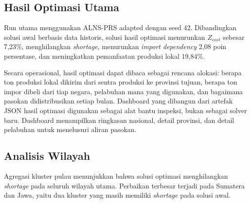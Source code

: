\documentclass[journal]{IEEEtran}
\theoremstyle{definition}
\theoremstyle{definition}
\theoremstyle{plain}
\begin{document}
    \subsection{Hasil Optimasi Utama}
    Run utama menggunakan ALNS-PRS adapted dengan seed 42. Dibandingkan solusi awal berbasis data historis, solusi hasil optimasi menurunkan $Z_{cost}$ sebesar 7,23\%, menghilangkan \textit{shortage}, menurunkan \textit{import dependency} 2,08 poin persentase, dan meningkatkan pemanfaatan produksi lokal 19,84\%.

    \begin{table}[H]
    \centering
    \caption{Perbandingan solusi awal dan ALNS-PRS adapted}
    \label{tab:main_result}
    \end{table}

    Secara operasional, hasil optimasi dapat dibaca sebagai rencana alokasi: berapa ton produksi lokal dikirim dari sentra produksi ke provinsi tujuan, berapa ton impor dibeli dari tiap negara, pelabuhan mana yang digunakan, dan bagaimana pasokan didistribusikan setiap bulan. Dashboard yang dibangun dari artefak JSON hasil optimasi digunakan sebagai alat bantu inspeksi, bukan sebagai solver baru. Dashboard menampilkan ringkasan nasional, detail provinsi, dan detail pelabuhan untuk menelusuri aliran pasokan.

    \subsection{Analisis Wilayah}
    Agregasi kluster pulau menunjukkan bahwa solusi optimasi menghilangkan \textit{shortage} pada seluruh wilayah utama. Perbaikan terbesar terjadi pada Sumatera dan Jawa, yaitu dua kluster yang masih memiliki \textit{shortage} pada solusi awal.
\end{document}

